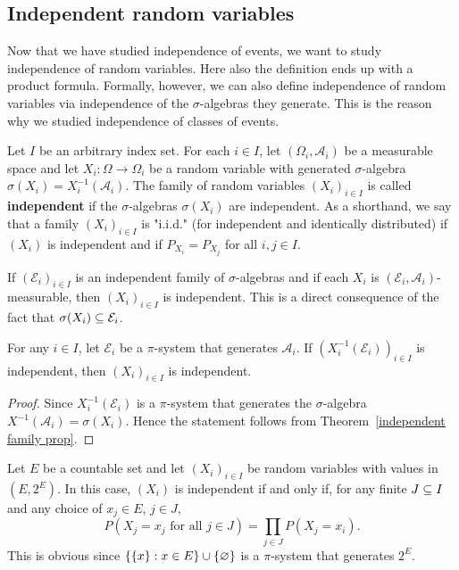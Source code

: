 \subsection{Independent random variables}
Now that we have studied independence of events, we want to study independence of random variables. Here also the definition ends up with a product formula. Formally, however, we can also define independence of random variables via independence of the $\sigma$-algebras they generate. This is the reason why we studied independence of classes of events.\par
Let $I$ be an arbitrary index set. For each $i\in I$, let $(\Omega_i,\mathcal{A}_i)$ be a measurable space
and let $X_i:\Omega\to\Omega_i$ be a random variable with generated $\sigma$-algebra $\sigma(X_i)=X_i^{-1}(\mathcal{A}_i)$. The family of random variables $(X_i)_{i\in I}$ is called \textbf{independent} if the $\sigma$-algebras $\sigma(X_i)$ are independent. As a shorthand, we say that a family $(X_i)_{i\in I}$ is "i.i.d." (for independent and identically distributed) if $(X_i)$ is independent and if $P_{X_i}=P_{X_j}$ for all $i,j\in I$.
\begin{example}
If $(\mathcal{E}_i)_{i\in I}$ is an independent family of $\sigma$-algebras and if each $X_i$ is $(\mathcal{E}_i,\mathcal{A}_i)$-measurable, then $(X_i)_{i\in I}$ is independent. This is a direct consequence of the fact that $\sigma(X_i)\subseteq\mathcal{E}_i$.
\end{example}
\begin{theorem}
For any $i\in I$, let $\mathcal{E}_i$ be a $\pi$-system that generates $\mathcal{A}_i$. If $(X_i^{-1}(\mathcal{E}_i))_{i\in I}$ is independent, then $(X_i)_{i\in I}$ is independent.
\end{theorem}
\begin{proof}
Since $X_i^{-1}(\mathcal{E}_i)$ is a $\pi$-system that generates the $\sigma$-algebra $X^{-1}(\mathcal{A}_i)=\sigma(X_i)$. Hence the statement follows from Theorem~\ref{independent family prop}.
\end{proof}
\begin{example}
Let $E$ be a countable set and let $(X_i)_{i\in I}$ be random variables with values in $(E,2^E)$. In this case, $(X_i)$ is independent if and only if, for any finite $J\subseteq I$ and any choice of $x_j\in E$, $j\in J$,
\[P(X_j=x_j\text{ for all $j\in J$})=\prod_{j\in J}P(X_j=x_i).\]
This is obvious since $\{\{x\}:x\in E\}\cup\{\varnothing\}$ is a $\pi$-system that generates $2^E$.
\end{example}
